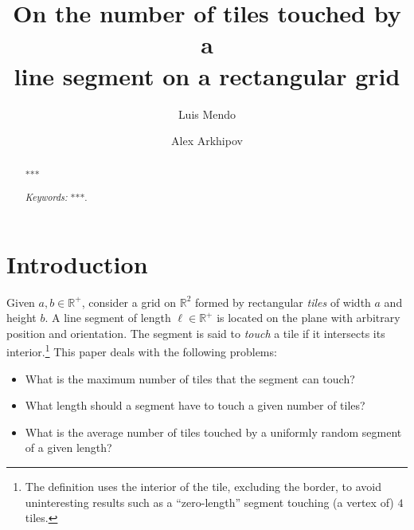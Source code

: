 \documentclass[12pt, a4paper]{article}
\newcommand{\len}{\ell} %
\begin{document}
\title{
On the number of tiles touched by a\\
line segment on a rectangular grid
}

\author[1]{Luis Mendo}
\author[2]{Alex Arkhipov}




\maketitle

\begin{abstract}
***

\emph{Keywords:} ***.

\end{abstract}


\section{Introduction}
\label{part: intro}

Given $a, b \in \mathbb R^+$, consider a grid on $\mathbb R^2$ formed by rectangular \emph{tiles} of width $a$ and height $b$. A line segment of length $\len \in \mathbb R^+$ is located on the plane with arbitrary position and orientation. The segment is said to \emph{touch} a tile if it intersects its interior.\footnote{
The definition uses the interior of the tile, excluding the border, to avoid uninteresting results such as a ``zero-length'' segment touching (a vertex of) $4$ tiles.} This paper deals with the following problems:
\begin{itemize}
\item What is the maximum number of tiles that the segment can touch?
\item What length should a segment have to touch a given number of tiles?
\item What is the average number of tiles touched by a uniformly random segment of a given length?
\end{itemize}
\end{document}

